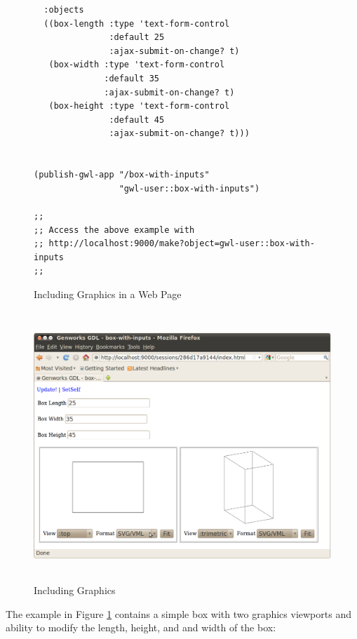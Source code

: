 \documentclass [11pt]{book}
\begin{document}
\begin{figure}
\begin{lrbox}{\boxedverb}
\begin{minipage}{\linewidth}
{\begin{verbatim}
  :objects 
  ((box-length :type 'text-form-control
               :default 25
               :ajax-submit-on-change? t)
   (box-width :type 'text-form-control
              :default 35
              :ajax-submit-on-change? t)
   (box-height :type 'text-form-control
               :default 45
               :ajax-submit-on-change? t)))


(publish-gwl-app "/box-with-inputs" 
                 "gwl-user::box-with-inputs")

;;
;; Access the above example with 
;; http://localhost:9000/make?object=gwl-user::box-with-inputs
;;

\end{verbatim}}
\end{minipage}
\end{lrbox}
\fbox{\usebox{\boxedverb}}

\caption{Including Graphics in a Web Page}

\label{fig:gwl-5}

\end{figure}

\begin{figure}
\begin{center}
\includegraphics[width=5in,height=4in]{../images/gwl-5.png}
\end{center}

\caption{Including Graphics}

\label{fig:gwl-5-image}

\end{figure}


The example in Figure 
\ref{fig:gwl-5} contains a simple box with two graphics viewports
and ability to modify the length, height, and and width of the box:
\end{document}
